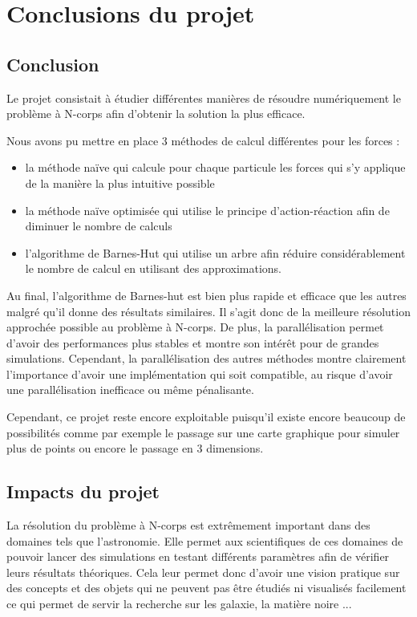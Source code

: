 \chapter{Conclusions du projet}

\section{Conclusion}

Le projet consistait à étudier différentes manières de résoudre numériquement le problème à N-corps afin d'obtenir la solution la plus efficace.

Nous avons pu mettre en place $3$ méthodes de calcul différentes pour les forces :

\begin{itemize}
\item la méthode naïve qui calcule pour chaque particule les forces qui s'y applique de la manière la plus intuitive possible

\item la méthode naïve optimisée qui utilise le principe d'action-réaction afin de diminuer le nombre de calculs

\item l'algorithme de Barnes-Hut qui utilise un arbre afin réduire considérablement le nombre de calcul en utilisant des approximations.

\end{itemize}


Au final, l'algorithme de Barnes-hut est bien plus rapide et efficace que les autres malgré qu'il donne des résultats similaires. Il s'agit donc de la meilleure résolution approchée possible au problème à N-corps. De plus, la parallélisation permet d'avoir des performances plus stables et montre son intérêt pour de grandes simulations. Cependant, la parallélisation des autres méthodes montre clairement l'importance d'avoir une implémentation qui soit compatible, au risque d'avoir une parallélisation inefficace ou même pénalisante.

Cependant, ce projet reste encore exploitable puisqu'il existe encore beaucoup de possibilités comme par exemple le passage sur une carte graphique pour simuler plus de points ou encore le passage en 3 dimensions.

\section{Impacts du projet}

La résolution du problème à N-corps est extrêmement important dans des domaines tels que l'astronomie. Elle permet aux scientifiques de ces domaines de pouvoir lancer des simulations en testant différents paramètres afin de vérifier leurs résultats théoriques.
Cela leur permet donc d'avoir une vision pratique sur des concepts et des objets qui ne peuvent pas être étudiés ni visualisés facilement ce qui permet de servir la recherche sur les galaxie, la matière noire ...



